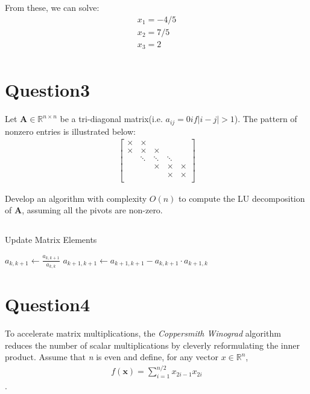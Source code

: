 \documentclass{article}
\newcommand{\R}{\mathbb{R}}
\begin{document}
From these, we can solve:
\begin{align*}
    x_1 = -4/5\\
    x_2 = 7/5\\
    x_3 = 2 \\
\end{align*}

\section*{Question3}
Let \(\bm{A} \in \R^{n \times n}\) be a tri-diagonal matrix(i.e. \(a_{ij} = 0 if |i - j| > 1\)). The pattern of nonzero entries is illustrated below:
\begin{align*}
    \begin{bmatrix}
        \times & \times & & & \\
        \times & \times & \times & & \\
        & \ddots & \ddots & \ddots & \\
        & &  \times & \times &\times \\
        & & & \times & \times \\
    \end{bmatrix}
\end{align*}

\noindent 
Develop an algorithm with complexity \(\textit{O}(n)\) to compute the LU decomposition of \(\bm{A}\), assuming all the pivots are non-zero.

\subsection*{ }

\begin{algorithm}
    \caption{Update Matrix Elements}
    \begin{algorithmic}[1]
            \State $a_{k,k+1} \gets \frac{a_{k,k+1}}{a_{k,k}}$
            \State $a_{k+1,k+1} \gets a_{k+1,k+1} - a_{k,k+1} \cdot a_{k+1,k}$
        \EndFor
    \end{algorithmic}
\end{algorithm}


\section*{Question4}
To accelerate matrix multiplications, the \textit{Coppersmith Winograd} algorithm reduces the number of scalar multiplications by cleverly reformulating
the inner product. Assume that \textit{n} is even and define, for any vector \(x \in \R^n\),
\begin{align*}
    f(\bm{x}) = \sum_{i = 1}^{n / 2} x_{2i - 1} x_{2i}
\end{align*}.
\end{document}
